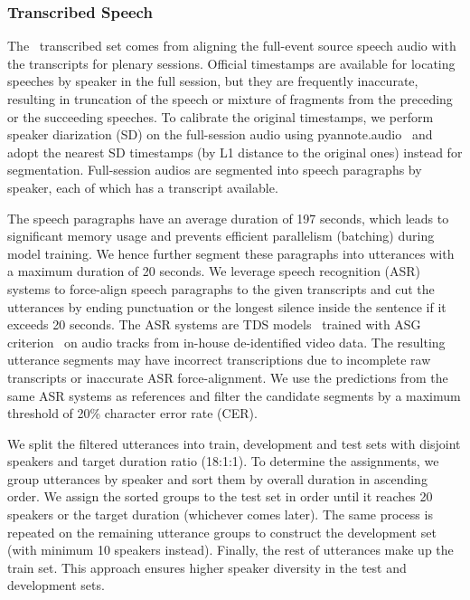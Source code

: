\subsubsection{Transcribed Speech}
\label{sec:transcribed_speech}
The \vp~transcribed set comes from aligning the full-event source speech audio with the transcripts for plenary sessions. Official timestamps are available for locating speeches by speaker in the full session, but they are frequently inaccurate, resulting in truncation of the speech or mixture of fragments from the preceding or the succeeding speeches. To calibrate the original timestamps, we perform speaker diarization (SD) on the full-session audio using pyannote.audio~\citep{Bredin2020} and adopt the nearest SD timestamps (by L1 distance to the original ones) instead for segmentation. Full-session audios are segmented into speech paragraphs by speaker, each of which has a transcript available.

The speech paragraphs have an average duration of 197 seconds, which leads to significant memory usage and prevents efficient parallelism (batching) during model training. We hence further segment these paragraphs into utterances with a maximum duration of 20 seconds. We leverage speech recognition (ASR) systems to force-align speech paragraphs to the given transcripts and cut the utterances by ending punctuation or the longest silence inside the sentence if it exceeds 20 seconds. The ASR systems are TDS models~\citep{TDS2019} trained with ASG criterion~\citep{collobert2016wav2letter} on audio tracks from in-house de-identified video data. The resulting utterance segments may have incorrect transcriptions due to incomplete raw transcripts or inaccurate ASR force-alignment. We use the predictions from the same ASR systems as references and filter the candidate segments by a maximum threshold of 20\% character error rate (CER).

We split the filtered utterances into train, development and test sets with disjoint speakers and target duration ratio (18:1:1). To determine the assignments, we group utterances by speaker and sort them by overall duration in ascending order. We assign the sorted groups to the test set in order until it reaches 20 speakers or the target duration (whichever comes later). The same process is repeated on the remaining utterance groups to construct the development set (with minimum 10 speakers instead). Finally, the rest of utterances make up the train set. This approach ensures higher speaker diversity in the test and development sets.

